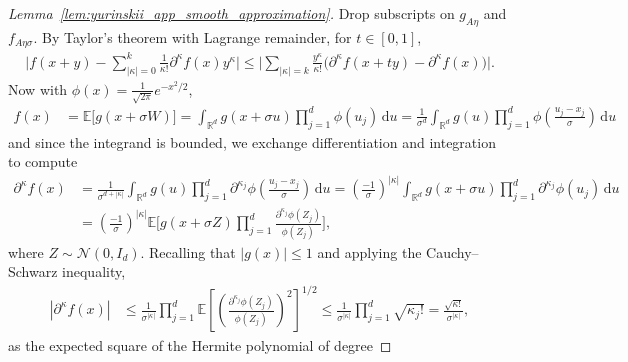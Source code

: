 \documentclass[11pt,lof]{puthesis}
\newcommand{\R}{\ensuremath{\mathbb{R}}}
\newcommand{\E}{\ensuremath{\mathbb{E}}}
\newcommand{\cN}{\ensuremath{\mathcal{N}}}
\newcommand{\diff}[1]{\,\mathrm{d}#1}
\theoremstyle{break}
\theoremstyle{proof}
\newtheorem{proof}{Proof}
\begin{document}
\begin{proof}[Lemma~\ref{lem:yurinskii_app_smooth_approximation}]
  Drop subscripts on $g_{A\eta}$ and $f_{A \eta \sigma}$.
  By Taylor's theorem with Lagrange remainder, for $t \in [0,1]$,
  \begin{align*}
    \Bigg|
    f(x + y)
    - \sum_{|\kappa|=0}^{k}
    \frac{1}{\kappa!}
    \partial^{\kappa} f(x)
    y^\kappa
    \Bigg|
    \leq
    \Bigg|
    \sum_{|\kappa|=k}
    \frac{y^\kappa}{\kappa!}
    \big(
      \partial^{\kappa} f(x + t y)
      - \partial^{\kappa} f(x)
    \big)
    \Bigg|.
  \end{align*}
  Now with $\phi(x) = \frac{1}{\sqrt{2 \pi}} e^{-x^2/2}$,
  \begin{align*}
    f(x)
    &=
    \E\big[g(x + \sigma W) \big]
    =
    \int_{\R^d}
    g(x + \sigma u)
    \prod_{j=1}^{d}
    \phi(u_j)
    \diff u
    =
    \frac{1}{\sigma^d}
    \int_{\R^d}
    g(u)
    \prod_{j=1}^{d}
    \phi \left( \frac{u_j-x_j}{\sigma} \right)
    \diff u
  \end{align*}
  and since the integrand is bounded, we exchange differentiation and
  integration to compute
  \begin{align}
    \nonumber
    \partial^\kappa
    f(x)
    &=
    \frac{1}{\sigma^{d+|\kappa|}}
    \int_{\R^d}
    g(u)
    \prod_{j=1}^{d}
    \partial^{\kappa_j}
    \phi \left( \frac{u_j-x_j}{\sigma} \right)
    \diff u
    = \left( \frac{-1}{\sigma} \right)^{|\kappa|}
    \int_{\R^d}
    g(x + \sigma u)
    \prod_{j=1}^{d}
    \partial^{\kappa_j}
    \phi(u_j)
    \diff u \\
    \label{eq:yurinskii_app_smoothing_derivative}
    &=
    \left( \frac{-1}{\sigma} \right)^{|\kappa|}
    \E \Bigg[
      g(x + \sigma Z)
      \prod_{j=1}^{d}
      \frac{\partial^{\kappa_j}\phi(Z_j)}{\phi(Z_j)}
    \Bigg],
  \end{align}
  where $Z \sim \cN(0, I_d)$.
  Recalling that $|g(x)| \leq 1$ and applying the Cauchy--Schwarz inequality,
  \begin{align*}
    \left|
      \partial^\kappa
      f(x)
    \right|
    &\leq
    \frac{1}{\sigma^{|\kappa|}}
    \prod_{j=1}^{d}
    \E \left[
      \left(
        \frac{\partial^{\kappa_j}\phi(Z_j)}{\phi(Z_j)}
      \right)^2
    \right]^{1/2}
    \leq
    \frac{1}{\sigma^{|\kappa|}}
    \prod_{j=1}^{d}
    \sqrt{\kappa_j!}
    =
    \frac{\sqrt{\kappa!}}{\sigma^{|\kappa|}},
  \end{align*}
  as the expected square of the Hermite polynomial of degree

\end{proof}
\end{document}
